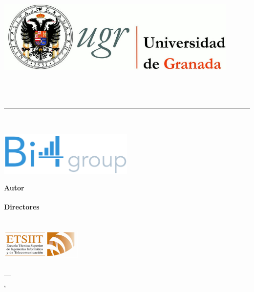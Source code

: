 \begin{titlepage}
 
 
\newlength{\centeroffset}
\setlength{\centeroffset}{-0.5\oddsidemargin}
\addtolength{\centeroffset}{0.5\evensidemargin}
\thispagestyle{empty}

\noindent\hspace*{\centeroffset}

\begin{minipage}{\textwidth}

\centering
\includegraphics[width=0.9\textwidth]{imagenes/logo_ugr.jpg}\\[1.4cm]

\textsc{ \Large \MakeUppercase{\myDocument}\\[0.2cm]}
\textsc{ \MakeUppercase{\myDegree}}\\[1cm]
% 
{\Huge\bfseries \myTitle \\
}
\noindent\rule[-1ex]{\textwidth}{3pt}\\[3.5ex]
{\large\bfseries \myCompany}\\[0.6cm]
\includegraphics[width=0.5\textwidth]{imagenes/bi4group.png}\\

\end{minipage}

\vspace{1cm}
\noindent\hspace*{\centeroffset}

\begin{minipage}{\textwidth}
\centering

\textbf{Autor}\\ {\myName}\\[2.5ex]
\textbf{Directores}\\
{\myProf\\
\myOtherProf}\\[1cm]
\includegraphics[width=0.3\textwidth]{imagenes/etsiit_logo.png}\\[0.1cm]
\textsc{\myFacultyShort}\\
\textsc{---}\\
\myLocation, \myTime
\end{minipage}
\end{titlepage}


